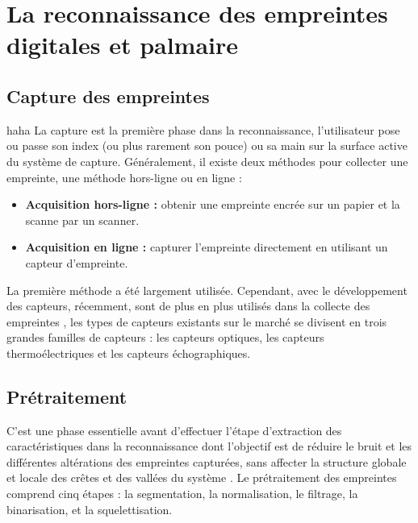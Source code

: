 \chapter{La reconnaissance des empreintes digitales et palmaire} %

\label{Appendix1} %


\section{Capture des empreintes}

haha
La capture est la première phase dans la reconnaissance, l’utilisateur pose ou passe son index (ou plus rarement son pouce) ou sa main sur la surface active du système de capture. Généralement, il existe deux méthodes pour collecter une empreinte, une méthode hors-ligne ou en ligne :
\begin{itemize}
	\item \textbf{Acquisition hors-ligne :} obtenir une empreinte encrée sur un papier et la scanne par un scanner.
	\item \textbf{Acquisition en ligne :} capturer l'empreinte  directement en utilisant un capteur d'empreinte.
\end{itemize}
La première méthode a été largement utilisée. Cependant, avec le développement des capteurs, récemment, sont de plus en plus utilisés dans la collecte des empreintes \citep{Bhanu2004}, les types de capteurs existants sur le marché se divisent en trois grandes familles de capteurs : les capteurs optiques, les capteurs thermoélectriques et les capteurs échographiques.
\section{Prétraitement}
\label{pretrait}
C’est une phase essentielle avant d’effectuer l’étape d’extraction des caractéristiques dans la reconnaissance dont l’objectif est de réduire le bruit et les différentes altérations des empreintes capturées, sans affecter la structure globale et locale des crêtes et des vallées du système  \citep{hong1998integrating}. Le prétraitement des empreintes comprend cinq étapes : la segmentation, la normalisation, le filtrage, la binarisation, et la squelettisation. 
